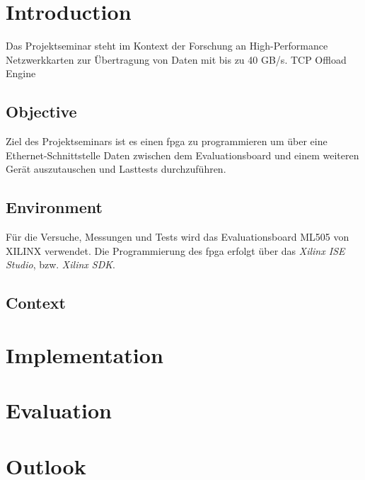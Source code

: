 \chapter{Introduction}

Das Projektseminar steht im Kontext der Forschung an High-Performance Netzwerkkarten zur Übertragung von Daten mit bis zu 40 GB/s. TCP Offload Engine

\section{Objective}

Ziel des Projektseminars ist es einen \gls{fpga} zu programmieren um über eine Ethernet-Schnittstelle Daten zwischen dem Evaluationsboard und einem weiteren Gerät 
auszutauschen und Lasttests durchzuführen.

\section{Environment}

Für die Versuche, Messungen und Tests wird das Evaluationsboard ML505 von XILINX verwendet. Die Programmierung des \gls{fpga} erfolgt über das \textit{Xilinx ISE Studio}, bzw. \textit{Xilinx SDK}.

\section{Context}


\chapter{Implementation}

\chapter{Evaluation}

\chapter{Outlook}